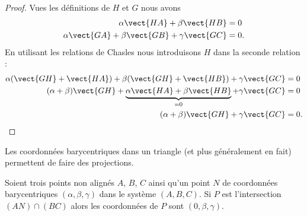 \begin{proof}
	Vues les définitions de \( H\) et \( G\) nous avons
	\begin{subequations}
		\begin{align}
			\alpha\vect{ HA }+\beta\vect{ HB }                   & =0  \\
			\alpha\vect{ GA }+\beta\vect{ GB }+\gamma\vect{ GC } & =0.
		\end{align}
	\end{subequations}
	En utilisant les relations de Chasles nous introduisons \( H\) dans la seconde relation :
	\begin{subequations}
		\begin{align}
			\alpha(\vect{ GH }+\vect{ HA })+\beta(\vect{ GH }+\vect{ HB })+\gamma\vect{ GC }                      & =0  \\
			(\alpha+\beta)\vect{ GH }+\underbrace{  \alpha\vect{ HA }+\beta\vect{ HB }   }_{=0}+\gamma\vect{ GC } & =0  \\
			(\alpha+\beta)\vect{ GH }+\gamma\vect{ GC }                                                           & =0.
		\end{align}
	\end{subequations}
\end{proof}

Les coordonnées barycentriques dans un triangle (et plus généralement en fait) permettent de faire des projections.

\begin{proposition}     \label{PROPooBCUVooWKttiH}
	Soient trois points non alignés \( A\), \( B\), \( C\) ainsi qu'un point \( N\) de coordonnées barycentriques  \( (\alpha,\beta,\gamma) \) dans le système \( (A,B,C)\). Si \( P\) est l'intersection \( (AN)\cap(BC)\) alors les coordonnées de \( P\) sont \( (0,\beta,\gamma)\).
\end{proposition}

